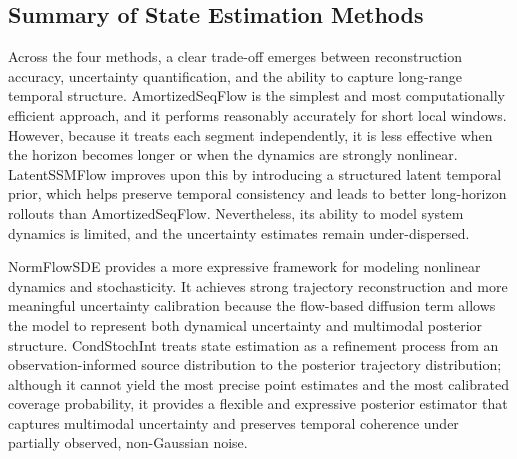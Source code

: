 \subsection{Summary of State Estimation Methods}

Across the four methods, a clear trade-off emerges between reconstruction accuracy, uncertainty quantification, and the ability to capture long-range temporal structure. AmortizedSeqFlow is the simplest and most computationally efficient approach, and it performs reasonably accurately for short local windows. However, because it treats each segment independently, it is less effective when the horizon becomes longer or when the dynamics are strongly nonlinear. LatentSSMFlow improves upon this by introducing a structured latent temporal prior, which helps preserve temporal consistency and leads to better long-horizon rollouts than AmortizedSeqFlow. Nevertheless, its ability to model system dynamics is limited, and the uncertainty estimates remain under-dispersed.

NormFlowSDE provides a more expressive framework for modeling nonlinear dynamics and stochasticity. It achieves strong trajectory reconstruction and more meaningful uncertainty calibration because the flow-based diffusion term allows the model to represent both dynamical uncertainty and multimodal posterior structure. CondStochInt treats state estimation as a refinement process from an observation-informed source distribution to the posterior trajectory distribution; although it cannot yield the most precise point estimates and the most calibrated coverage probability, it provides a flexible and expressive posterior estimator that captures multimodal uncertainty and preserves temporal coherence under partially observed, non-Gaussian noise.

